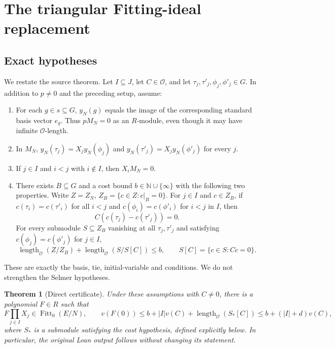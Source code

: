 \documentclass[11pt]{article}
\newtheorem{theorem}{Theorem}[section]\newtheorem{lemma}[theorem]{Lemma}\newtheorem{proposition}[theorem]{Proposition}
\newcommand{\OO}{\mathcal O}\newcommand{\FF}{\operatorname{Fitt}_0}\newcommand{\len}{\operatorname{length}_{\OO}}\newcommand{\val}{\operatorname{v}}\newcommand{\Hom}{\operatorname{Hom}}\newcommand{\Span}{\operatorname{span}}\newcommand{\code}[1]{\texttt{\detokenize{#1}}}
\newcommand{\src}[2]{\href{https://github.com/VladimirReshetnikov/ProveIt/blob/9050b04000647d588d0c78d945180abcd3b0bcf7/Analysis/GeneralizedRiemannHypothesis/Lean/grh/src/#1}{#2}}
\begin{document}
\section{The triangular Fitting-ideal replacement}
\subsection{Exact hypotheses}
We restate the source theorem. Let $I\subseteq J$, let $C\in\OO$, and let $\tau_j,\tau'_j,\phi_j,\phi'_j\in G$. In addition to $p\ne0$ and the preceding setup, assume:
\begin{enumerate}
\item For each $g\in s\subseteq G$, $y_N(g)$ equals the image of the corresponding standard basis vector $e_g$. Thus $pM_N=0$ as an $R$-module, even though it may have infinite $\OO$-length.
\item In $M_N$, $y_N(\tau_j)=X_jy_N(\phi_j)$ and $y_N(\tau'_j)=X_jy_N(\phi'_j)$ for every $j$.
\item If $j\in I$ and $i<j$ with $i\notin I$, then $X_iM_N=0$.
\item There exists $B\subseteq G$ and a cost bound $b\in\mathbb N\cup\{\infty\}$ with the following two properties. Write $Z=Z_N$, $Z_B=\{c\in Z:c|_B=0\}$. For $j\in I$ and $c\in Z_B$, if $c(\tau_i)=c(\tau'_i)$ for all $i<j$ and $c(\phi_i)=c(\phi'_i)$ for $i<j$ in $I$, then
\[
 C(c(\tau_j)-c(\tau'_j))=0.
\]
For every submodule $S\subseteq Z_B$ vanishing at all $\tau_j,\tau'_j$ and satisfying $c(\phi_j)=c(\phi'_j)$ for $j\in I$,
\[
 \len(Z/Z_B)+\len(S/S[C])\le b,
 \qquad S[C]=\{c\in S:Cc=0\}.
\]
\end{enumerate}
These are exactly the basis, tie, initial-variable and \src{New/Congruences/FirstOrder/FittingBlock.lean\#L46}{\code{HasTriangleCost}} conditions. We do not strengthen the Selmer hypotheses.
\begin{theorem}[Direct certificate]\label{thm:main}
Under these assumptions with $C\ne0$, there is a polynomial $F\in R$ such that
\[
 F\prod_{j\in I}X_j\in\FF(E/N),\qquad
 v(F(0))\le b+|I|v(C)+\len(S_*[C])
 \le b+(|I|+d)v(C),
\]
where $S_*$ is a submodule satisfying the cost hypothesis, defined explicitly below. In particular, the original Lean output follows without changing its statement.
\end{theorem}
\end{document}
